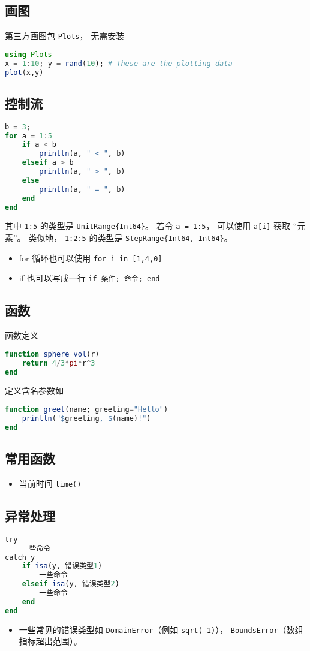 \subsection{画图}
第三方画图包 \verb|Plots|， 无需安装
\begin{lstlisting}[language=Julia]
using Plots
x = 1:10; y = rand(10); # These are the plotting data
plot(x,y)
\end{lstlisting}

\subsection{控制流}
\begin{lstlisting}[language=Julia]
b = 3;
for a = 1:5
    if a < b
        println(a, " < ", b)
    elseif a > b
        println(a, " > ", b)
    else
        println(a, " = ", b)
    end
end
\end{lstlisting}
其中 \verb|1:5| 的类型是 \verb|UnitRange{Int64}|。 若令 \verb|a = 1:5|， 可以使用 \verb|a[i]| 获取 “元素”。 类似地， \verb|1:2:5| 的类型是 \verb|StepRange{Int64, Int64}|。

\begin{itemize}
\item for 循环也可以使用 \verb|for i in [1,4,0]|
\item if 也可以写成一行 \verb|if 条件; 命令; end|
\end{itemize}

\subsection{函数}
函数定义
\begin{lstlisting}[language=julia]
function sphere_vol(r)
    return 4/3*pi*r^3
end
\end{lstlisting}

定义含名参数如
\begin{lstlisting}[language=julia]
function greet(name; greeting="Hello")
    println("$greeting, $(name)!")
end
\end{lstlisting}

\subsection{常用函数}
\begin{itemize}
\item 当前时间 \verb|time()|
\end{itemize}

\subsection{异常处理}
\begin{lstlisting}[language=julia]
try 
    一些命令
catch y
    if isa(y, 错误类型1)
        一些命令
    elseif isa(y, 错误类型2)
        一些命令
    end
end
\end{lstlisting}
\begin{itemize}
\item 一些常见的错误类型如 \verb|DomainError|（例如 \verb|sqrt(-1)|）， \verb|BoundsError|（数组指标超出范围）。
\end{itemize}


